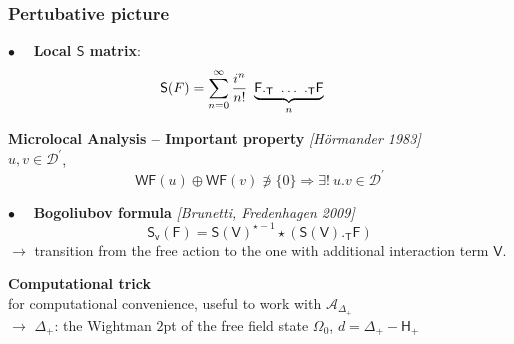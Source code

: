\documentclass[9pt]{beamer}
\newcommand{\WF}{\mathsf{WF}} %
\newcommand{\citebeam}[1]{\textit{\textcolor{black!60!white}{[#1]}}} %
\newcommand{\Acal}{\mathcal{A}}
\newcommand{\Dcal}{\mathcal{D}}
\newcommand{\Fsf}{\mathsf{F}}
\newcommand{\Hsf}{\mathsf{H}}
\newcommand{\Psf}{\mathsf{P}}
\newcommand{\Ssf}{\mathsf{S}}
\newcommand{\Tsf}{\mathsf{T}}
\newcommand{\Vsf}{\mathsf{V}}
\newcommand{\vsf}{\mathsf{v}}
\begin{document}

\begin{frame}%

\frametitle{Pertubative picture}

\vspace*{8pt}

$\bullet \quad$ \textbf{Local $\Ssf$ matrix}:
\vspace*{-17pt}
\begin{equation*}
 \hspace*{-25pt} \Ssf(F) = \sum_{n=0}^{\infty} \frac{i^n}{n!} \ \underbrace{\Fsf ._\Tsf \ \dots \ ._\Tsf \Fsf}_{n}
\end{equation*}

\begin{block}{}
\vspace*{-10pt}
\textbf{Microlocal Analysis --  Important property} \citebeam{Hörmander 1983} \\
$u,v \in \Dcal^\prime$, 
\vspace*{-10pt}
\begin{equation*}
\WF(u) \oplus \WF(v) \not\ni \{0\} \Rightarrow \exists! \ u.v \in \Dcal^\prime
\end{equation*}
\vspace*{-16pt}
\end{block}


$\bullet \quad$ \textbf{Bogoliubov formula} \citebeam{Brunetti, Fredenhagen 2009} \\ %
\vspace*{-10pt}
\begin{equation*}
 \Ssf_\vsf(\Fsf) = \Ssf(\Vsf)^{\star -1} \star \left( \Ssf(\Vsf) ._{\Tsf} \Fsf \right) 
\end{equation*}
$\to$  transition from the free action to the one with additional interaction term $\Vsf$.



\begin{exampleblock}{}
\vspace*{-10pt}
\textbf{Computational trick} \\
for computational convenience, useful to work with $\Acal_{\Delta_+}$ \\
$\to$ $\Delta_+$: the Wightman $2$pt of the free field state $\Omega_0$, $d=\Delta_+ - \Hsf_+$
\end{exampleblock}


  



\end{frame}
\end{document}
